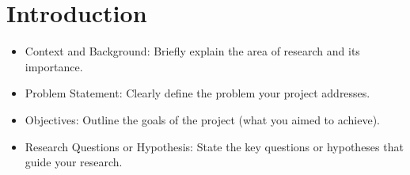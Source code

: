 
\section{Introduction}


\begin{itemize}
    \item Context and Background: Briefly explain the area of research and its importance.
    \item Problem Statement: Clearly define the problem your project addresses.
    \item Objectives: Outline the goals of the project (what you aimed to achieve).
    \item Research Questions or Hypothesis: State the key questions or hypotheses that guide your research.

\end{itemize}





\begin{comment}
    


\subsection{Summary of Contributions}



\subsection{Future Work}




\subsection{Takeaways}


\end{comment}

